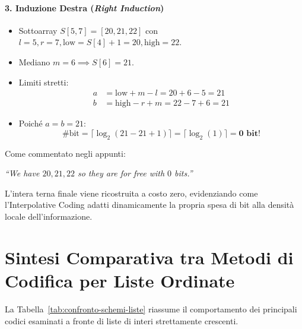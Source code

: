 \paragraph{3. Induzione Destra (\textit{Right Induction})}
\begin{itemize}
  \item Sottoarray $S[5, 7] = [20, 21, 22]$ con $l = 5, r = 7, \text{low} = S[4] + 1 = 20, \text{high} = 22$.
  \item Mediano $m = 6 \implies S[6] = 21$.
  \item Limiti stretti:
  \begin{align*}
    a &= \text{low} + m - l = 20 + 6 - 5 = 21 \\
    b &= \text{high} - r + m = 22 - 7 + 6 = 21
  \end{align*}
  \item Poich\'e $a = b = 21$:
  \begin{equation*}
    \#\text{bit} = \lceil \log_2(21 - 21 + 1) \rceil = \lceil \log_2(1) \rceil = \mathbf{0 \text{ bit!}}
  \end{equation*}
\end{itemize}

Come commentato negli appunti:
\begin{center}
  \textit{``We have $20, 21, 22$ so they are for free with $0$ bits.''}
\end{center}
L'intera terna finale viene ricostruita a costo zero, evidenziando come l'Interpolative Coding adatti dinamicamente la propria spesa di bit alla densit\`a locale dell'informazione.

\FloatBarrier
\section{Sintesi Comparativa tra Metodi di Codifica per Liste Ordinate}
\label{sec:comparativa-metodi-liste}

La Tabella~\ref{tab:confronto-schemi-liste} riassume il comportamento dei principali codici esaminati a fronte di liste di interi strettamente crescenti.

